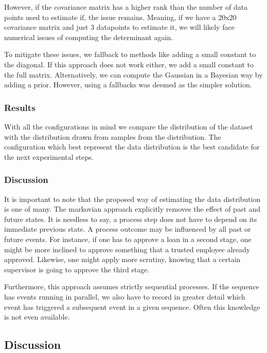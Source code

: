 \documentclass[./../../paper.tex]{subfiles}
\begin{document}
However, if the covariance matrix has a higher rank than the number of data points used to estimate if, the issue remains. Meaning, if we have a 20x20 covariance matrix and just 3 datapoints to estimate it, we will likely face numerical issues of computing the determinant again.

To mitigate these issues, we fallback to methods like adding a small constant to the diagonal. If this approach does not work either, we add a small constant to the full matrix. Alternatively, we can compute the Gaussian in a Bayesian way by adding a prior. However, using a fallbacks was deemed as the simpler solution.

\subsubsection{Results}
With all the configurations in mind we compare the distribution of the dataset with the distribution drawn from samples from the distribution. The configuration which best represent the data distribution is the best candidate for the next experimental steps.  


\subsubsection{Discussion}
It is important to note that the proposed way of estimating the data distribution is one of many. The markovian approach explicitly removes the effect of past and future states. It is needless to say, a process step does not have to depend on its immediate previous state. A process outcome may be influenced by all past or future events. For instance, if one has to approve a loan in a second stage, one might be more inclined to approve something that a trusted employee already approved. Likewise, one might apply more scrutiny, knowing that a certain supervisor is going to approve the third stage.

Furthermore, this approach assumes strictly sequential processes. If the sequence has events running in parallel, we also have to record in greater detail which event has triggered a subsequent event in a given sequence. Often this knowledge is not even available.


\subsection{Discussion}
\end{document}
